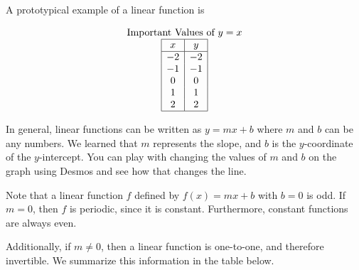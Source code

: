 \documentclass[nooutcomes]{ximera}
\begin{document}
\begin{example}
A prototypical example of a linear function is 

\begin{center}
\end{center}

\begin{center}
\end{center}


\[
\begin{array}{  c  }
\text{\normalfont Important Values of $y=x$} \\
 \begin{array}{|c|c|}
 \hline
 x & y\\
 \hline
 -2&-2\\
 -1&-1\\
 0&0\\
 1&1\\
 2&2\\
 \hline
\end{array}
\end{array}
\]

\end{example}

In general, linear functions can be written as $y=mx+b$ where $m$ and $b$ can be any numbers. We learned that $m$ represents the slope, and $b$ is the $y$-coordinate of the $y$-intercept. You can play with changing the values of $m$ and $b$ on the graph using Desmos and see how that changes the line.  

\begin{center}  
\end{center}

Note that a linear function $f$ defined by $f(x) = mx + b$ with $b = 0$ is odd. If $m = 0$, then $f$ is periodic, since it is constant. Furthermore, constant functions are always even.

Additionally, if $m \ne 0$, then a linear function is one-to-one, and therefore invertible. We summarize this information in the table below.
\end{document}
